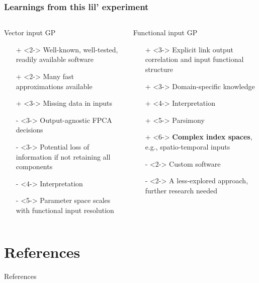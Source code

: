 \documentclass[aspectratio=169,t]{beamer}
\begin{document}
\begin{frame}
  \frametitle{Learnings from this lil' experiment}

  \small

  \begin{columns}[t]
    \begin{column}{.45\textwidth}
      Vector input GP
      \begin{itemize}
      \item[+]<2-> Well-known, well-tested, readily available software
      \item[+]<2-> Many fast approximations available
      \item[+]<3-> Missing data in inputs
      \end{itemize}
      \vspace{0.25cm}
      \begin{itemize}
      \item[-]<3-> Output-agnostic FPCA decisions%
      \item[-]<3-> Potential loss of information if not retaining all
        components
      \item[-]<4-> Interpretation
      \item[-]<5-> Parameter space scales with
        functional input resolution
      \end{itemize}
    \end{column}

    \begin{column}{.45\textwidth}
      Functional input GP
      \begin{itemize}
      \item[+]<3-> Explicit link output correlation and
        input functional structure
      \item[+]<3-> Domain-specific knowledge
      \item[+]<4-> Interpretation
      \item[+]<5-> Parsimony
      \item[+]<6-> \alert{\textbf{Complex index spaces}},
        e.g., spatio-temporal inputs
      \end{itemize}
      \vspace{0.25cm}
      \begin{itemize}
      \item[-]<2-> Custom software
      \item[-]<2-> A less-explored approach, further research needed
      \end{itemize}
    \end{column}
  \end{columns}

\end{frame}

\section{References}

\begin{frame}{References}
  \tiny
  
  
\end{frame}
\end{document}
